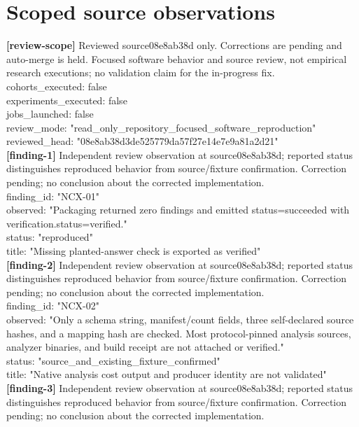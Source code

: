 \documentclass[11pt]{article}
\begin{document}
\section*{Scoped source observations}
\textbf{[review-scope]} Reviewed source08e8ab38d only. Corrections are pending and auto-merge is held. Focused software behavior and source review, not empirical research executions; no validation claim for the in-progress fix.\\
cohorts\_executed: false\\
experiments\_executed: false\\
jobs\_launched: false\\
review\_mode: "read\_only\_repository\_focused\_software\_reproduction"\\
reviewed\_head: "08e8ab38d3de525779da57f27e14e7e9a81a2d21"\\
\textbf{[finding-1]} Independent review observation at source08e8ab38d; reported status distinguishes reproduced behavior from source/fixture confirmation. Correction pending; no conclusion about the corrected implementation.\\
finding\_id: "NCX-01"\\
observed: "Packaging returned zero findings and emitted status=succeeded with verification.status=verified."\\
status: "reproduced"\\
title: "Missing planted-answer check is exported as verified"\\
\textbf{[finding-2]} Independent review observation at source08e8ab38d; reported status distinguishes reproduced behavior from source/fixture confirmation. Correction pending; no conclusion about the corrected implementation.\\
finding\_id: "NCX-02"\\
observed: "Only a schema string, manifest/count fields, three self-declared source hashes, and a mapping hash are checked. Most protocol-pinned analysis sources, analyzer binaries, and build receipt are not attached or verified."\\
status: "source\_and\_existing\_fixture\_confirmed"\\
title: "Native analysis cost output and producer identity are not validated"\\
\textbf{[finding-3]} Independent review observation at source08e8ab38d; reported status distinguishes reproduced behavior from source/fixture confirmation. Correction pending; no conclusion about the corrected implementation.\\
\end{document}
